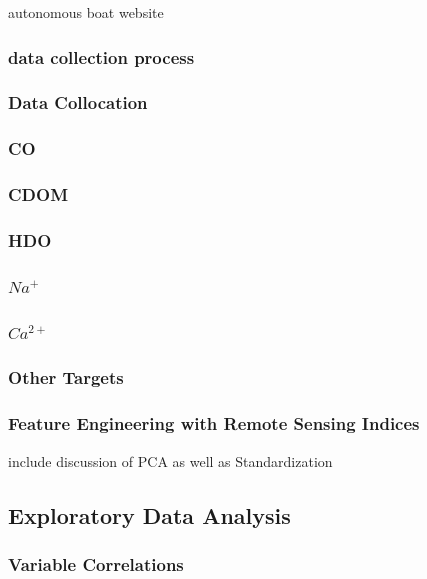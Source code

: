 \documentclass[remotesensing,article,submit,pdftex,moreauthors]{Definitions/mdpi}
\begin{document}
autonomous boat website \cite{Otter}


\subsubsection{data collection process}
\subsubsection{Data Collocation}

\subsubsection{CO}
\subsubsection{CDOM}
\subsubsection{HDO}
\subsubsection{$Na^{+}$}
\subsubsection{$Ca^{2+}$}
\subsubsection{Other Targets}

\subsubsection{Feature Engineering with Remote Sensing Indices}
include discussion of PCA as well as Standardization


\subsection{Exploratory Data Analysis}
\subsubsection{Variable Correlations}
\end{document}

